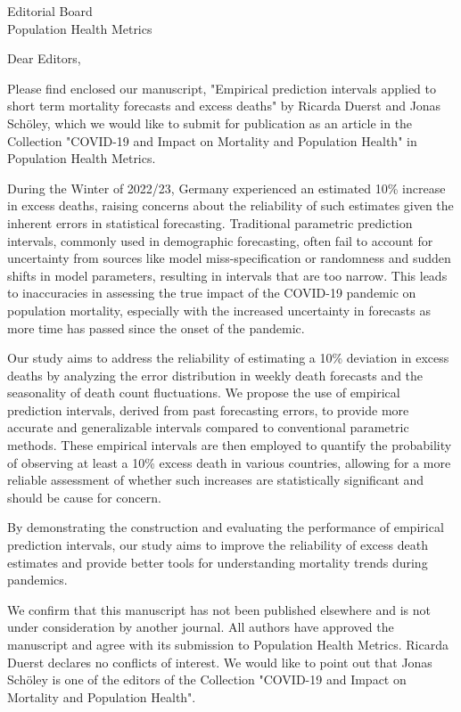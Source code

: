 \documentclass[a4paper,12pt]{letter}
\date{\today}
\begin{document}
\begin{letter}{Editorial Board\\Population Health Metrics\\}

\opening{Dear Editors,}

Please find enclosed our manuscript, "Empirical prediction intervals applied to short term mortality forecasts and excess deaths" by Ricarda Duerst and Jonas Schöley, which we would like to submit for publication as an article in the Collection "COVID-19 and Impact on Mortality and Population Health" in Population Health Metrics.

During the Winter of 2022/23, Germany experienced an estimated 10\% increase in excess deaths, raising concerns about the reliability of such estimates given the inherent errors in statistical forecasting. Traditional parametric prediction intervals, commonly used in demographic forecasting, often fail to account for uncertainty from sources like model miss-specification or randomness and sudden shifts in model parameters, resulting in intervals that are too narrow. This leads to inaccuracies in assessing the true impact of the COVID-19 pandemic on population mortality, especially with the increased uncertainty in forecasts as more time has passed since the onset of the pandemic.

Our study aims to address the reliability of estimating a 10\% deviation in excess deaths by analyzing the error distribution in weekly death forecasts and the seasonality of death count fluctuations. We propose the use of empirical prediction intervals, derived from past forecasting errors, to provide more accurate and generalizable intervals compared to conventional parametric methods. These empirical intervals are then employed to quantify the probability of observing at least a 10\% excess death in various countries, allowing for a more reliable assessment of whether such increases are statistically significant and should be cause for concern.

By demonstrating the construction and evaluating the performance of empirical prediction intervals, our study aims to improve the reliability of excess death estimates and provide better tools for understanding mortality trends during pandemics.

We confirm that this manuscript has not been published elsewhere and is not under consideration by another journal. All authors have approved the manuscript and agree with its submission to Population Health Metrics. Ricarda Duerst declares no conflicts of interest. We would like to point out that Jonas Schöley is one of the editors of the Collection "COVID-19 and Impact on Mortality and Population Health".


\end{letter}
\end{document}
